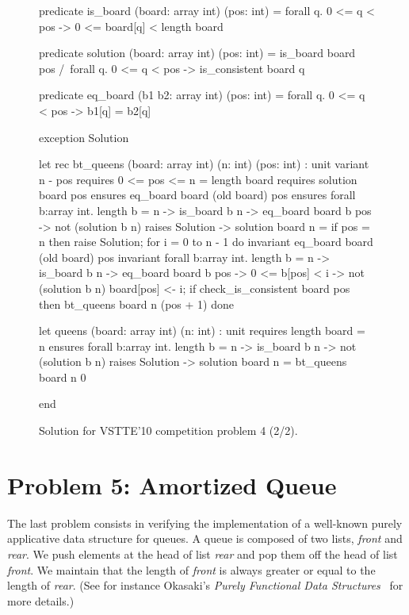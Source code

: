 \begin{figure}
  \centering
\begin{whycode}
  predicate is_board (board: array int) (pos: int) =
    forall q. 0 <= q < pos -> 0 <= board[q] < length board

  predicate solution (board: array int) (pos: int) =
    is_board board pos /\
    forall q. 0 <= q < pos -> is_consistent board q

  predicate eq_board (b1 b2: array int) (pos: int) =
    forall q. 0 <= q < pos -> b1[q] = b2[q]

  exception Solution

  let rec bt_queens (board: array int) (n: int) (pos: int) : unit
    variant  { n - pos }
    requires { 0 <= pos <= n = length board }
    requires { solution board pos }
    ensures  { eq_board board (old board) pos }
    ensures  { forall b:array int. length b = n -> is_board b n ->
                 eq_board board b pos -> not (solution b n) }
    raises   { Solution -> solution board n }
  = if pos = n then raise Solution;
    for i = 0 to n - 1 do
      invariant { eq_board board (old board) pos }
      invariant { forall b:array int. length b = n -> is_board b n ->
        eq_board board b pos -> 0 <= b[pos] < i -> not (solution b n) }
      board[pos] <- i;
      if check_is_consistent board pos then bt_queens board n (pos + 1)
    done

  let queens (board: array int) (n: int) : unit
    requires { length board = n }
    ensures  { forall b:array int.
                 length b = n -> is_board b n -> not (solution b n) }
    raises   { Solution -> solution board n }
  = bt_queens board n 0

end
\end{whycode}
\vspace*{-1em}%
  \caption{Solution for VSTTE'10 competition problem 4 (2/2).}
  \label{fig:NQueens2}
\end{figure}

\section{Problem 5: Amortized Queue}
\label{sec:AQueue}

The last problem consists in verifying the implementation of a
well-known purely applicative data structure for queues.
A queue is composed of two lists, \textit{front} and \textit{rear}.
We push elements at the head of list \textit{rear} and pop them off
the head of list \textit{front}. We maintain that the length of
\textit{front} is always greater or equal to the length of \textit{rear}.
(See for instance Okasaki's \emph{Purely Functional Data
  Structures}~\cite{okasaki98} for more details.)

